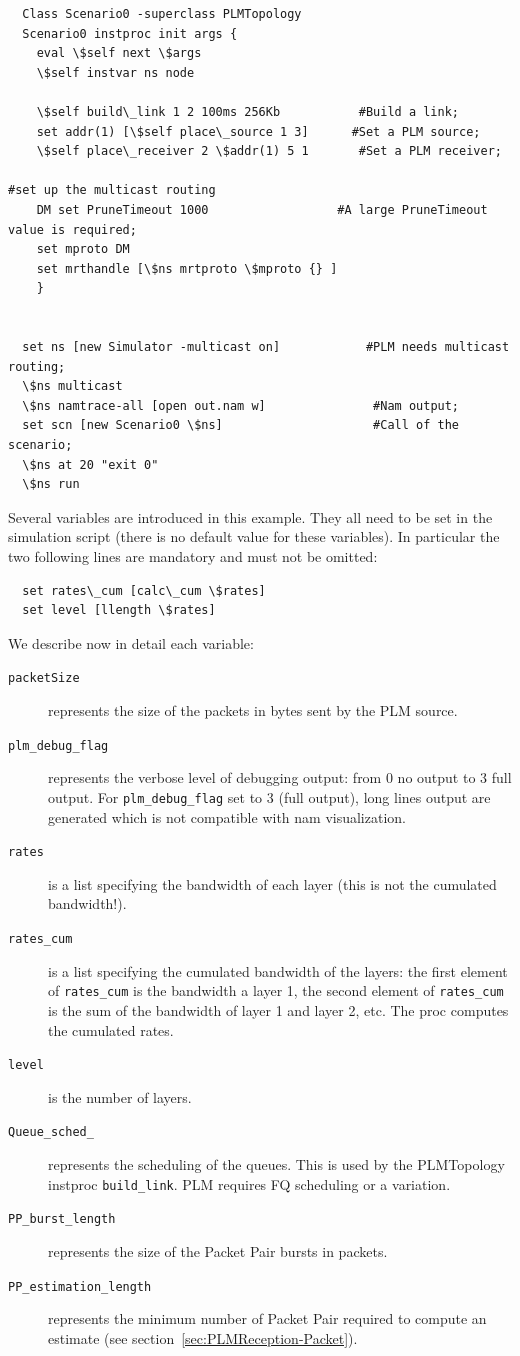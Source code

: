 {\begin{verbatim}
  Class Scenario0 -superclass PLMTopology
  Scenario0 instproc init args {
    eval \$self next \$args
    \$self instvar ns node
    
    \$self build\_link 1 2 100ms 256Kb           #Build a link;
    set addr(1) [\$self place\_source 1 3]      #Set a PLM source;
    \$self place\_receiver 2 \$addr(1) 5 1       #Set a PLM receiver;
    
#set up the multicast routing
    DM set PruneTimeout 1000                  #A large PruneTimeout value is required;
    set mproto DM
    set mrthandle [\$ns mrtproto \$mproto {} ]
    }


  set ns [new Simulator -multicast on]            #PLM needs multicast routing;
  \$ns multicast
  \$ns namtrace-all [open out.nam w]               #Nam output;
  set scn [new Scenario0 \$ns]                     #Call of the scenario;
  \$ns at 20 "exit 0"
  \$ns run
\end{verbatim}

Several variables are introduced in this example. They all need to be set in the
simulation script (there is no default value for these variables). In particular
the two following lines  are mandatory and must not be omitted:
\begin{verbatim}
  set rates\_cum [calc\_cum \$rates]
  set level [llength \$rates]
\end{verbatim}

We describe now in detail each variable:
\begin{description}
\item[\tt packetSize] represents the size of the packets in bytes sent by the PLM
  source. 
\item [\tt plm\_debug\_flag] represents the verbose level of debugging output: from 0 no
  output to 3 full output. For {\tt plm\_debug\_flag} set to 3 (full output), long
  lines output are 
  generated which is not compatible with nam visualization. 
\item [\tt rates] is a list specifying
  the bandwidth of each layer (this is not the cumulated bandwidth!). 
\item [\tt rates\_cum] is a list specifying the cumulated bandwidth of the
  layers: the first element of {\tt rates\_cum} is the bandwidth a layer 1, the
  second element of {\tt rates\_cum} is the sum of the bandwidth of layer 1 and
  layer 2, etc. The proc  computes the cumulated rates. 
\item [\tt level] is the number of layers. 
\item [\tt Queue\_sched\_] represents the scheduling of the queues. This is used by the
  PLMTopology instproc {\tt build\_link}. PLM requires FQ scheduling or a
  variation. 
\item [\tt PP\_burst\_length] represents the size of the Packet Pair bursts
  in packets. 
\item [\tt PP\_estimation\_length] represents the minimum number of Packet
  Pair required to compute an estimate (see
  section~\ref{sec:PLMReception-Packet}). 
\end{description}


}
